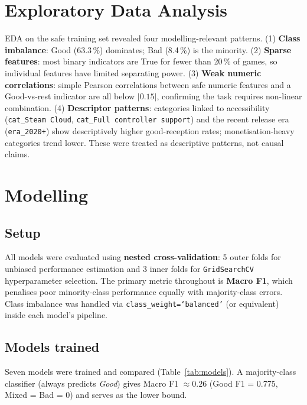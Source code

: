 \documentclass[11pt, a4paper]{article}
\begin{document}
\section{Exploratory Data Analysis}
\label{sec:eda}

EDA on the safe training set revealed four modelling-relevant patterns.
(1) \textbf{Class imbalance}: Good (63.3\,\%) dominates; Bad (8.4\,\%) is the minority.
(2) \textbf{Sparse features}: most binary indicators are True for fewer than 20\,\% of
games, so individual features have limited separating power.
(3) \textbf{Weak numeric correlations}: simple Pearson correlations between safe numeric
features and a Good-vs-rest indicator are all below $|0.15|$, confirming the task
requires non-linear combination.
(4) \textbf{Descriptor patterns}: categories linked to accessibility
(\texttt{cat\_Steam Cloud}, \texttt{cat\_Full controller support}) and the recent release
era (\texttt{era\_2020+}) show descriptively higher good-reception rates;
monetisation-heavy categories trend lower. These were treated as descriptive patterns,
not causal claims.

\section{Modelling}
\label{sec:modelling}

\subsection{Setup}
All models were evaluated using \textbf{nested cross-validation}:
5 outer folds for unbiased performance estimation and 3 inner folds for
\texttt{GridSearchCV} hyperparameter selection.
The primary metric throughout is \textbf{Macro F1}, which penalises poor minority-class
performance equally with majority-class errors.
Class imbalance was handled via \texttt{class\_weight=`balanced'} (or equivalent)
inside each model's pipeline.

\subsection{Models trained}
Seven models were trained and compared
(Table~\ref{tab:models}).
A majority-class classifier (always predicts \textit{Good}) gives Macro F1 $\approx 0.26$
(Good F1 = 0.775, Mixed = Bad = 0) and serves as the lower bound.
\end{document}
